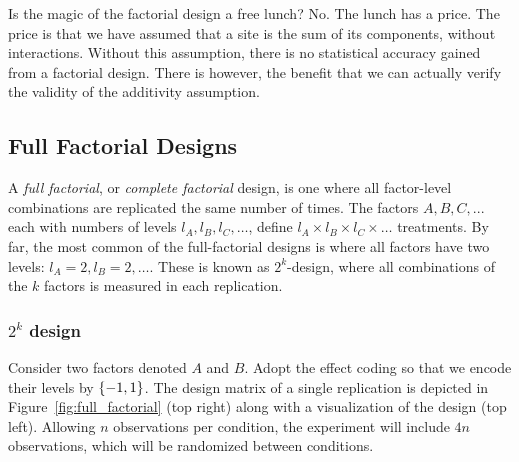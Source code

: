 \begin{think}
Is the magic of the factorial design a free lunch? 
No. The lunch has a price.
The price is that we have assumed that a site is the sum of its components, without interactions. 
Without this assumption, there is no statistical accuracy gained from a factorial design.
There is however, the benefit that we can actually verify the validity of the additivity assumption.
\end{think}








\subsection{Full Factorial Designs}
A \emph{full factorial}, or \emph{complete factorial} design, is one where all factor-level combinations are replicated the same number of times.
The factors $A,B,C,...$ each with numbers of levels $l_A,l_B,l_C,\dots$, define $l_A\times l_B \times l_C \times \dots$ treatments. 
By far, the most common of the full-factorial designs is where all factors have two levels: $l_A=2, l_B=2, \dots$.
These is known as $2^k$-design, where all combinations of the $k$ factors is measured in each replication.



\subsubsection{$2^k$ design}
Consider two factors denoted $A$ and $B$.
Adopt the effect coding so that we encode their levels by $\{ -1,1 \}$.
The design matrix of a single replication is depicted in Figure~\ref{fig:full_factorial} (top right) along with a visualization of the design (top left).
Allowing $n$ observations per condition, the experiment will include $4n$ observations, which will be randomized between conditions.

